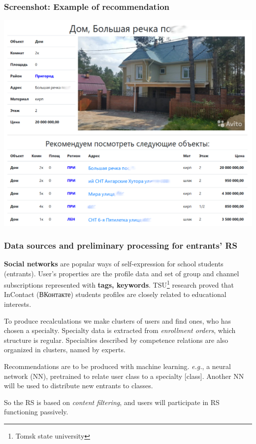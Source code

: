\documentclass[10pt,dvipsnames]{beamer}
\begin{document}
\begin{frame}
  \frametitle{Screenshot: Example of recommendation}
   \includegraphics[width=1\linewidth]{screen-recommends.png}
\end{frame}

\begin{frame}
  \frametitle{Data sources and preliminary processing for entrants' RS}
  \textbf{Social networks} are popular ways of self-expression for school students (entrants).  User's properties are the profile data and set of group and channel subscriptions represented with \textbf{tags, keywords}.  TSU\footnote{Tomsk state university} research proved that InContact (ВКонтакте) students profiles are closely related to educational interests.

  To produce recalculations we make clusters of users and find ones, who has chosen a specialty.  Specialty data is extracted from \emph{enrollment orders}, which structure is regular.  Specialties described by competence relations are also organized in clusters, named by experts.

  Recommendations are to be produced with machine learning. \emph{e.g.}, a neural network (NN), pretrained to relate user class to a specialty [class].  Another NN will be used to distribute new entrants to classes.

  So the RS is based on \emph{content filtering}, and users will participate in RS functioning passively.
\end{frame}
\end{document}
